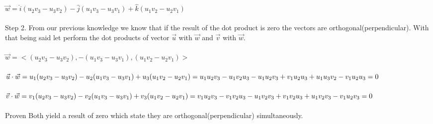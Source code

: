 \documentclass{article}
\begin{document}
\begin{enumerate}[a.]
$\vec{w} = \hat{i}(u_{2}v_{3}-u_{3}v_{2})-\hat{j}(u_{1}v_{3}-u_{3}v_{1})+\hat{k}(u_{1}v_{2}-u_{2}v_{1})$\\
\\
Step 2. From our previous knowledge we know that if the result of the dot product is zero the vectors are orthogonal(perpendicular). With that being said let perform the dot products of vector $\vec{u}$ with $\vec{w}$ and $\vec{v}$ with $\vec{w}$.\\
\\
$\vec{w} = <(u_{2}v_{3}-u_{3}v_{2}),-(u_{1}v_{3}-u_{3}v_{1}),(u_{1}v_{2}-u_{2}v_{1})>$\\
\\
$\vec{u}\cdot\vec{w}=u_{1}(u_{2}v_{3}-u_{3}v_{2})-u_{2}(u_{1}v_{3}-u_{3}v_{1})+u_{3}(u_{1}v_{2}-u_{2}v_{1})\\=u_{1}u_{2}v_{3}-u_{1}v_{2}u_{3}-u_{1}u_{2}v_{3}+v_{1}u_{2}u_{3}+u_{1}u_{3}v_{2}-v_{1}u_{2}u_{3}=0$\\
\\ 
$\vec{v}\cdot\vec{w}=v_{1}(u_{2}v_{3}-u_{3}v_{2})-v_{2}(u_{1}v_{3}-u_{3}v_{1})+v_{3}(u_{1}v_{2}-u_{2}v_{1})\\=v_{1}u_{2}v_{3}-v_{1}v_{2}u_{3}-u_{1}v_{2}v_{3}+v_{1}v_{2}u_{3}+u_{1}v_{2}v_{3}-v_{1}u_{2}v_{3}=0$\\
\\
Proven Both yield a result of zero which state they are orthogonal(perpendicular) simultaneously.
\end{enumerate}
\end{document}
